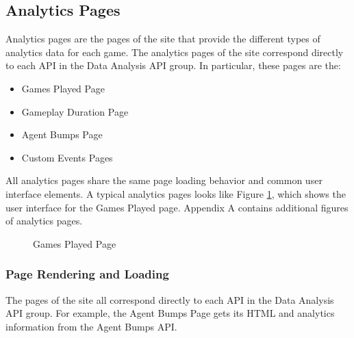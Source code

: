 \subsection{Analytics Pages}

Analytics pages are the pages of the site that provide the different types of analytics data for each game. The analytics pages of the site correspond directly to each API in the Data Analysis API group. In particular, these pages are the:
	\begin{itemize}
		\item Games Played Page
		\item Gameplay Duration Page
		\item Agent Bumps Page
		\item Custom Events Pages
	\end{itemize}
All analytics pages share the same page loading behavior and common user interface elements. A typical analytics pages looks like Figure \ref{fig:games_played}, which shows the user interface for the Games Played page. Appendix A contains additional figures of analytics pages.

\medskip
\begin{figure}[htb]
	\caption[Analytics Site: Games Played]{\label{fig:games_played} Games Played Page}
\end{figure}

\subsubsection{Page Rendering and Loading}

The pages of the site all correspond directly to each API in the Data Analysis API group. For example, the Agent Bumps Page gets its HTML and analytics information from the Agent Bumps API.

